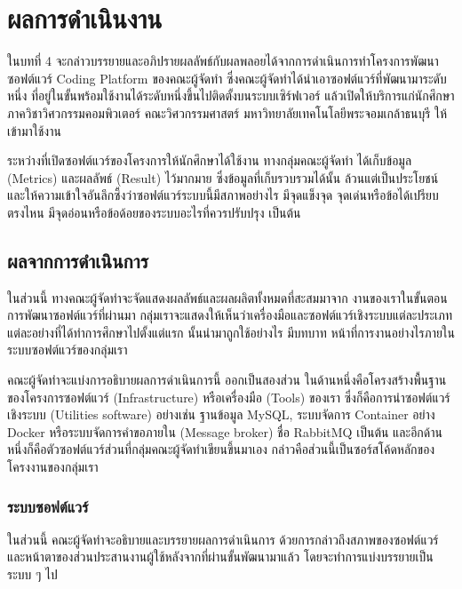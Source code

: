 \documentclass[12pt,one side,openright,a4paper]{cpe-thesis-th}
\newcommand{\thaijustify}[1]{%
  \par\hspace{30pt}\justifying
  #1
}
\begin{document}
\chapter{ผลการดำเนินงาน}
\thaijustify{
    ในบทที่ 4 จะกล่าวบรรยายและอภิปรายผลลัพธ์กับผลพลอยได้จากการดำเนินการทำโครงการพัฒนาซอฟต์แวร์ Coding Platform ของคณะผู้จัดทำ ซึ่งคณะผู้จัดทำได้นำเอาซอฟต์แวร์ที่พัฒนามาระดับหนึ่ง ที่อยู่ในขั้นพร้อมใช้งานได้ระดับหนึ่งขึ้นไปติดตั้งบนระบบเซิร์ฟเวอร์ แล้วเปิดให้บริการแก่นักศึกษาภาควิชาวิศวกรรมคอมพิวเตอร์ คณะวิศวกรรมศาสตร์ มหาวิทยาลัยเทคโนโลยีพระจอมเกล้าธนบุรี ให้เข้ามาใช้งาน
}
\thaijustify{
    ระหว่างที่เปิดซอฟต์แวร์ของโครงการให้นักศึกษาได้ใช้งาน ทางกลุ่มคณะผู้จัดทำ ได้เก็บข้อมูล (Metrics) และผลลัพธ์ (Result) ไว้มากมาย ซึ่งข้อมูลที่เก็บรวบรวมได้นั้น ล้วนแต่เป็นประโยชน์และให้ความเข้าใจอันลึกซึ้งว่าซอฟต์แวร์ระบบนี้มีสภาพอย่างไร มีจุดแข็งจุด จุดเด่นหรือข้อได้เปรียบตรงไหน มีจุดอ่อนหรือข้อด้อยของระบบอะไรที่ควรปรับปรุง เป็นต้น
}
\section{ผลจากการดำเนินการ}
    \thaijustify{
        ในส่วนนี้ ทางคณะผู้จัดทำจะจัดแสดงผลลัพธ์และผลผลิตทั้งหมดที่สะสมมาจาก งานของเราในขั้นตอนการพัฒนาซอฟต์แวร์ที่ผ่านมา กลุ่มเราจะแสดงให้เห็นว่าเครื่องมือและซอฟต์แวร์เชิงระบบแต่ละประเภท แต่ละอย่างที่ได้ทำการศึกษาไปตั้งแต่แรก นั้นนำมาถูกใช้อย่างไร มีบทบาท หน้าที่การงานอย่างไรภายในระบบซอฟต์แวร์ของกลุ่มเรา
    }
    \thaijustify{
        คณะผู้จัดทำจะแบ่งการอธิบายผลการดำเนินการนี้ ออกเป็นสองส่วน ในด้านหนึ่งคือโครงสร้างพื้นฐานของโครงการซอฟต์แวร์ (Infrastructure) หรือเครื่องมือ (Tools) ของเรา ซึ่งก็คือการนำซอฟต์แวร์เชิงระบบ (Utilities software) อย่างเช่น ฐานข้อมูล MySQL, ระบบจัดการ Container อย่าง Docker หรือระบบจัดการคำขอภายใน (Message broker) ชื่อ RabbitMQ เป็นต้น และอีกด้านหนึ่งก็คือตัวซอฟต์แวร์ส่วนที่กลุ่มคณะผู้จัดทำเขียนขึ้นมาเอง กล่าวคือส่วนนี้เป็นซอร์สโค้ดหลักของโครงงานของกลุ่มเรา
    }
        \subsection{ระบบซอฟต์แวร์}
            ในส่วนนี้ คณะผู้จัดทำจะอธิบายและบรรยายผลการดำเนินการ ด้วยการกล่าวถึงสภาพของซอฟต์แวร์ และหน้าตาของส่วนประสานงานผู้ใช้หลังจากที่ผ่านขั้นพัฒนามาแล้ว โดยจะทำการแบ่งบรรยายเป็นระบบ ๆ ไป
\end{document}
